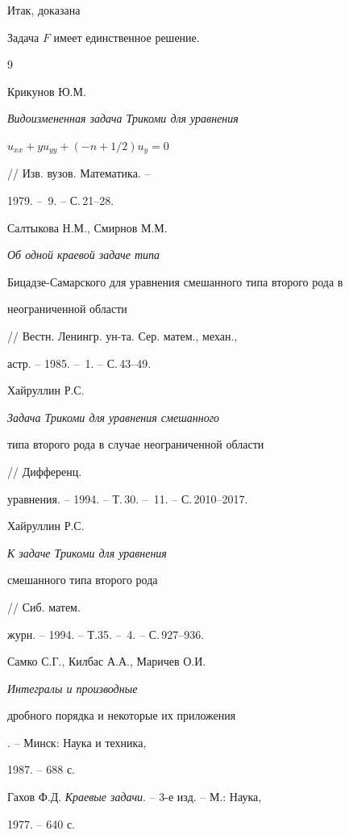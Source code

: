 Итак, доказана





\begin{thm}


Задача $F$ имеет единственное решение.


\end{thm}





\begin{thebibliography}{9}







Крикунов Ю.М. {\em Видоизмененная задача Трикоми для уравнения


$ u_{xx}+yu_{yy}+(-n+1/2)u_y=0$} // Изв. вузов. Математика. --


1979. -- \No\,9. -- С.\,21--28.




Салтыкова Н.М., Смирнов М.М. {\em Об одной краевой задаче типа


Бицадзе-Самарского для уравнения смешанного типа второго рода в


неограниченной области} // Вестн. Ленингр. ун-та. Сер. матем., механ.,


астр. -- 1985. -- \No\,1. -- С.\,43--49.




Хайруллин Р.С. {\em Задача Трикоми для уравнения смешанного


типа второго рода в случае неограниченной области} // Дифференц. 


уравнения. -- 1994. -- Т.\,30. -- \No\,11. -- С.\,2010--2017.




Хайруллин Р.С. {\em К задаче Трикоми для уравнения


смешанного типа второго рода} // Сиб. матем. 


журн. -- 1994. -- Т.35. -- \No\,4. -- С.\,927--936.




Самко С.Г., Килбас А.А., Маричев О.И. {\em Интегралы и производные


дробного порядка и некоторые их приложения}. -- Минск: Наука и техника,


1987. -- 688 с.




Гахов Ф.Д. {\em Краевые задачи}. -- 3-е изд. -- М.: Наука,


1977. -- 640 с.





\end{thebibliography}





